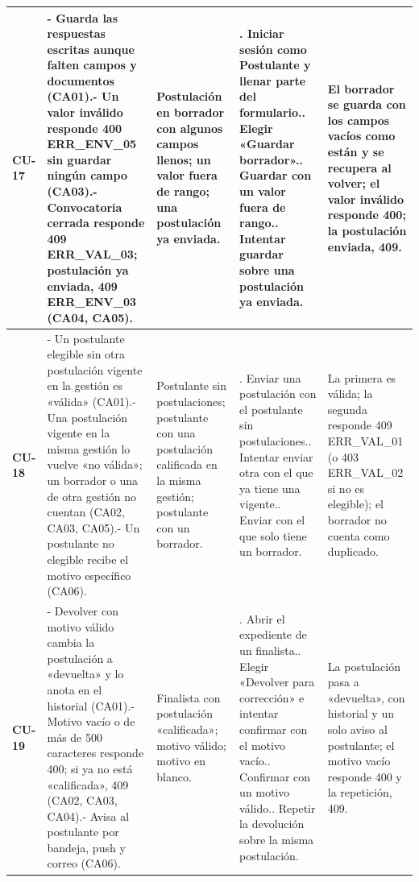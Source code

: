 {\begin{longtable}{@{}>{\raggedright\arraybackslash}p{1.2cm}>{\raggedright\arraybackslash}p{3.7cm}>{\raggedright\arraybackslash}p{3.0cm}>{\raggedright\arraybackslash}p{4.4cm}>{\raggedright\arraybackslash}p{3.4cm}@{}}
\midrule
\textbf{CU-17} & - Guarda las respuestas escritas aunque falten campos y documentos (CA01).\newline - Un valor inválido responde 400 ERR\_ENV\_05 sin guardar ningún campo (CA03).\newline - Convocatoria cerrada responde 409 ERR\_VAL\_03; postulación ya enviada, 409 ERR\_ENV\_03 (CA04, CA05). & Postulación en borrador con algunos campos llenos; un valor fuera de rango; una postulación ya enviada. & 1. Iniciar sesión como Postulante y llenar parte del formulario.\newline 2. Elegir «Guardar borrador».\newline 3. Guardar con un valor fuera de rango.\newline 4. Intentar guardar sobre una postulación ya enviada. & El borrador se guarda con los campos vacíos como están y se recupera al volver; el valor inválido responde 400; la postulación enviada, 409. \\
\midrule
\textbf{CU-18} & - Un postulante elegible sin otra postulación vigente en la gestión es «válida» (CA01).\newline - Una postulación vigente en la misma gestión lo vuelve «no válida»; un borrador o una de otra gestión no cuentan (CA02, CA03, CA05).\newline - Un postulante no elegible recibe el motivo específico (CA06). & Postulante sin postulaciones; postulante con una postulación calificada en la misma gestión; postulante con un borrador. & 1. Enviar una postulación con el postulante sin postulaciones.\newline 2. Intentar enviar otra con el que ya tiene una vigente.\newline 3. Enviar con el que solo tiene un borrador. & La primera es válida; la segunda responde 409 ERR\_VAL\_01 (o 403 ERR\_VAL\_02 si no es elegible); el borrador no cuenta como duplicado. \\
\midrule
\textbf{CU-19} & - Devolver con motivo válido cambia la postulación a «devuelta» y lo anota en el historial (CA01).\newline - Motivo vacío o de más de 500 caracteres responde 400; si ya no está «calificada», 409 (CA02, CA03, CA04).\newline - Avisa al postulante por bandeja, push y correo (CA06). & Finalista con postulación «calificada»; motivo válido; motivo en blanco. & 1. Abrir el expediente de un finalista.\newline 2. Elegir «Devolver para corrección» e intentar confirmar con el motivo vacío.\newline 3. Confirmar con un motivo válido.\newline 4. Repetir la devolución sobre la misma postulación. & La postulación pasa a «devuelta», con historial y un solo aviso al postulante; el motivo vacío responde 400 y la repetición, 409. \\

\end{longtable}}
